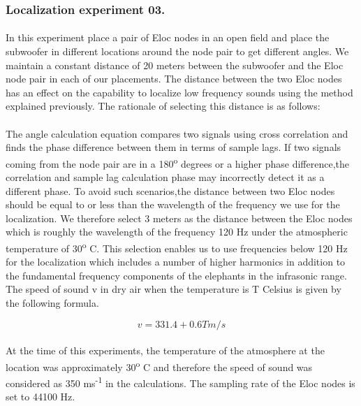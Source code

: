\documentclass[12pt]{article}
\numberwithin{figure}{section}
\numberwithin{table}{section}
\begin{document}
\newpage
\subsubsection{Localization experiment 03.}
\paragraph{}
In this experiment place a pair of Eloc nodes in an open field and place the subwoofer in different locations around the node pair to get different angles. We maintain a constant distance of 20 meters between the subwoofer and the Eloc node pair in each of our placements. The distance between the two Eloc nodes has an effect on the capability to localize low frequency sounds using the method explained previously. The rationale of selecting this distance is as follows:

\paragraph{}
The angle calculation equation compares two signals using cross correlation and finds the phase difference between
them in terms of sample lags. If two signals coming from the node pair are in a 180\textsuperscript{o} degrees or a higher phase difference,the correlation and sample lag calculation phase may incorrectly detect it as a different phase. To avoid such scenarios,the distance between two Eloc nodes should be equal to or less than the wavelength of the frequency we use for the localization. We therefore select 3 meters as the distance between the Eloc nodes which is roughly the wavelength of the frequency 120 Hz under the atmospheric temperature of 30\textsuperscript{o} C. This selection enables us to use frequencies below 120 Hz for the localization which includes a number of higher harmonics in addition to the fundamental frequency components of the elephants in the infrasonic range. The speed of sound v in dry air when the temperature is T Celsius is given by the following formula.

\begin{equation}
v = 331.4+0.6T m/s
\end{equation}
\paragraph{}
At the time of this experiments, the temperature of the atmosphere at the location was approximately
30\textsuperscript{o} C and therefore the speed of sound was considered as 350 ms\textsuperscript{-1} in the calculations. The sampling rate of the Eloc nodes is set to 44100 Hz.
\end{document}
